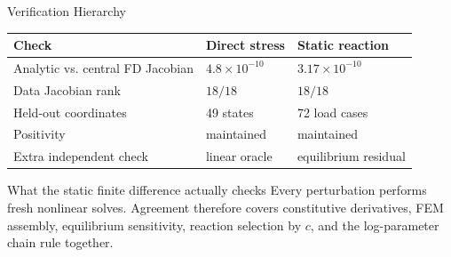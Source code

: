 \documentclass[aspectratio=169,10pt]{beamer}
\begin{document}
\begin{frame}{Verification Hierarchy}
  \small
  \begin{table}
    \centering
    \begin{tabular}{lll}
      \toprule
      Check & Direct stress & Static reaction \\
      \midrule
      Analytic vs. central FD Jacobian & $4.8\times10^{-10}$ &
        $3.17\times10^{-10}$ \\
      Data Jacobian rank & $18/18$ & $18/18$ \\
      Held-out coordinates & 49 states & 72 load cases \\
      Positivity & maintained & maintained \\
      Extra independent check & linear oracle & equilibrium residual \\
      \bottomrule
    \end{tabular}
  \end{table}

  \vspace{0.7em}
  \begin{block}{What the static finite difference actually checks}
    Every perturbation performs fresh nonlinear solves. Agreement therefore
    covers constitutive derivatives, FEM assembly, equilibrium sensitivity,
    reaction selection by $c$, and the log-parameter chain rule together.
  \end{block}
\end{frame}
\end{document}
